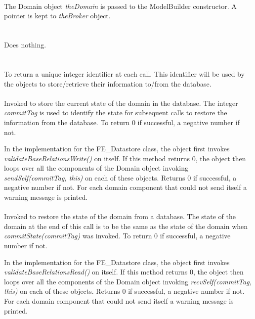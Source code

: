   \\
  \\ \\
The Domain object {\em theDomain} is passed to the ModelBuilder
constructor. A pointer is kept to {\em theBroker} object.\\

 \\
\\ 
Does nothing. \\

  \\
\\
To return a unique integer identifier at each call. This identifier
will be used by the objects to store/retrieve their information
to/from the database. \\

\\
Invoked to store the current state of the domain in the database. The
integer {\em commitTag} is used to identify the state for subsequent
calls to restore the information from the database. To return
$0$ if successful, a negative number if not. 

In the implementation for the FE\_Datastore class, the object first
invokes {\em validateBaseRelationsWrite()} on itself. If this method 
returns $0$, the object then loops over all the components of the
Domain object invoking {\em sendSelf(commitTag, this)} on each of
these objects. Returns $0$ if successful, a negative number if
not. For each domain component that could not send itself a warning
message is printed. \\ 

\\
Invoked to restore the state of the domain from a database. The state
of the domain at the end of this call is to be the same as the state
of the domain when {\em commitState(commitTag)} was invoked. To return
$0$ if successful, a negative number if not. 

In the implementation for the FE\_Datastore class, the object first
invokes {\em validateBaseRelationsRead()} on itself. If this method 
returns $0$, the object then loops over all the components of the
Domain object invoking {\em recvSelf(commitTag, this)} on each of
these objects. Returns $0$ if successful, a negative number if
not. For each domain component that could not send itself a warning
message is printed. \\ 


